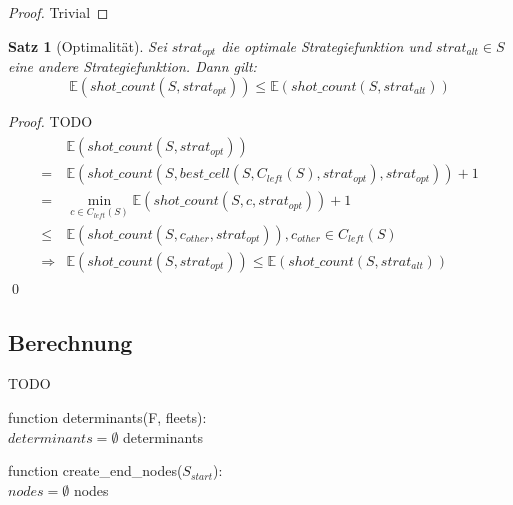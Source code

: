 \documentclass[a4paper,12pt]{llncs}
\numberwithin{equation}{section}
\newtheorem{satz}{Satz}
\begin{document}
\begin{proof}
Trivial
\end{proof}



\begin{satz}[Optimalität]
Sei $strat_{opt}$ die optimale Strategiefunktion und $strat_{alt} \in S$ eine andere Strategiefunktion.
Dann gilt:
\[
\mathds{E}(shot\_count(S, strat_{opt})) \leq \mathds{E}(shot\_count(S, strat_{alt}))
\]
\end{satz}

\begin{proof}
TODO
\begin{align}
\begin{split}
&\mathds{E}(shot\_count(S, strat_{opt}))\\
=&\mathds{E}(shot\_count(S, best\_cell(S, C_{left}(S), strat_{opt}), strat_{opt})) + 1\\
=&\min_{c \in C_{left}(S)} \mathds{E}(shot\_count(S, c, strat_{opt})) + 1\\
\leq & \mathds{E}(shot\_count(S, c_{other}, strat_{opt})), c_{other} \in C_{left}(S)\\
\Rightarrow &\mathds{E}(shot\_count(S, strat_{opt})) \leq \mathds{E}(shot\_count(S, strat_{alt}))
\end{split}
\end{align}
\qed
\end{proof}

\subsection{Berechnung}


TODO

\begin{algorithm}[H]
 function determinants(F, fleets):\\
 $determinants=\emptyset$\;
 \Return determinants\;
\end{algorithm}

\begin{algorithm}[H]
 function create\_end\_nodes($S_{start}$):\\
 $nodes=\emptyset$\;
  \Return nodes\;
\end{algorithm}
\end{document}
